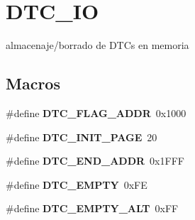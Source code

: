 \hypertarget{group__DTC__IO}{}\section{D\+T\+C\+\_\+\+IO}
\label{group__DTC__IO}


almacenaje/borrado de D\+TC\textquotesingle{}s en memoria  


\subsection*{Macros}
\begin{DoxyCompactItemize}
\item 
\mbox{\label{group__DTC__IO_gaf895544cfc22a7bab94504ea1d6e354c}} 
\#define {\bfseries D\+T\+C\+\_\+\+F\+L\+A\+G\+\_\+\+A\+D\+DR}~0x1000
\item 
\mbox{\label{group__DTC__IO_ga0d654918ede023d8b7a8b45bff063dff}} 
\#define {\bfseries D\+T\+C\+\_\+\+I\+N\+I\+T\+\_\+\+P\+A\+GE}~20
\item 
\mbox{\label{group__DTC__IO_ga239b4015a777f1ed98ec501f0362cbfc}} 
\#define {\bfseries D\+T\+C\+\_\+\+E\+N\+D\+\_\+\+A\+D\+DR}~0x1\+F\+FF
\item 
\mbox{\label{group__DTC__IO_gaa87f2fa3a82da552afa4de5630f5cb57}} 
\#define {\bfseries D\+T\+C\+\_\+\+E\+M\+P\+TY}~0x\+FE
\item 
\mbox{\label{group__DTC__IO_gaf377a303e8d85e07f9be5dfc016c4643}} 
\#define {\bfseries D\+T\+C\+\_\+\+E\+M\+P\+T\+Y\+\_\+\+A\+LT}~0x\+FF
\end{DoxyCompactItemize}
